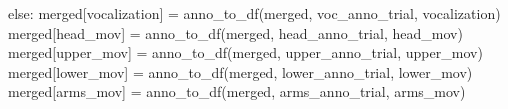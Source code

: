 \documentclass[
  letterpaper,
  DIV=11,
  numbers=noendperiod]{scrreprt}
\newenvironment{Shaded}{\begin{snugshade}}{\end{snugshade}}
\newcommand{\ControlFlowTok}[1]{\textcolor[rgb]{0.00,0.23,0.31}{#1}}
\newcommand{\NormalTok}[1]{\textcolor[rgb]{0.00,0.23,0.31}{#1}}
\newcommand{\OperatorTok}[1]{\textcolor[rgb]{0.37,0.37,0.37}{#1}}
\newcommand{\StringTok}[1]{\textcolor[rgb]{0.13,0.47,0.30}{#1}}
\begin{document}
\begin{Shaded}
\begin{Highlighting}[]
    \ControlFlowTok{else}\NormalTok{:}
\NormalTok{        merged[}\StringTok{\textquotesingle{}vocalization\textquotesingle{}}\NormalTok{] }\OperatorTok{=} \StringTok{\textquotesingle{}\textquotesingle{}}
\NormalTok{        anno\_to\_df(merged, voc\_anno\_trial, }\StringTok{\textquotesingle{}vocalization\textquotesingle{}}\NormalTok{)}
\NormalTok{        merged[}\StringTok{\textquotesingle{}head\_mov\textquotesingle{}}\NormalTok{] }\OperatorTok{=} \StringTok{\textquotesingle{}\textquotesingle{}}
\NormalTok{        anno\_to\_df(merged, head\_anno\_trial, }\StringTok{\textquotesingle{}head\_mov\textquotesingle{}}\NormalTok{)}
\NormalTok{        merged[}\StringTok{\textquotesingle{}upper\_mov\textquotesingle{}}\NormalTok{] }\OperatorTok{=} \StringTok{\textquotesingle{}\textquotesingle{}}
\NormalTok{        anno\_to\_df(merged, upper\_anno\_trial, }\StringTok{\textquotesingle{}upper\_mov\textquotesingle{}}\NormalTok{)}
\NormalTok{        merged[}\StringTok{\textquotesingle{}lower\_mov\textquotesingle{}}\NormalTok{] }\OperatorTok{=} \StringTok{\textquotesingle{}\textquotesingle{}}
\NormalTok{        anno\_to\_df(merged, lower\_anno\_trial, }\StringTok{\textquotesingle{}lower\_mov\textquotesingle{}}\NormalTok{)}
\NormalTok{        merged[}\StringTok{\textquotesingle{}arms\_mov\textquotesingle{}}\NormalTok{] }\OperatorTok{=} \StringTok{\textquotesingle{}\textquotesingle{}}
\NormalTok{        anno\_to\_df(merged, arms\_anno\_trial, }\StringTok{\textquotesingle{}arms\_mov\textquotesingle{}}\NormalTok{)}


\end{Highlighting}
\end{Shaded}
\end{document}
